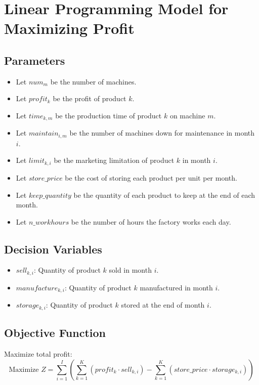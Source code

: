 \documentclass{article}
\begin{document}
\section*{Linear Programming Model for Maximizing Profit}

\subsection*{Parameters}
\begin{itemize}
    \item Let \( num_m \) be the number of machines.
    \item Let \( profit_k \) be the profit of product \( k \).
    \item Let \( time_{k,m} \) be the production time of product \( k \) on machine \( m \).
    \item Let \( maintain_{i,m} \) be the number of machines down for maintenance in month \( i \).
    \item Let \( limit_{k,i} \) be the marketing limitation of product \( k \) in month \( i \).
    \item Let \( store\_price \) be the cost of storing each product per unit per month.
    \item Let \( keep\_quantity \) be the quantity of each product to keep at the end of each month.
    \item Let \( n\_workhours \) be the number of hours the factory works each day.
\end{itemize}

\subsection*{Decision Variables}
\begin{itemize}
    \item \( sell_{k,i} \): Quantity of product \( k \) sold in month \( i \).
    \item \( manufacture_{k,i} \): Quantity of product \( k \) manufactured in month \( i \).
    \item \( storage_{k,i} \): Quantity of product \( k \) stored at the end of month \( i \).
\end{itemize}

\subsection*{Objective Function}
Maximize total profit:
\[
\text{Maximize } Z = \sum_{i=1}^{I} \left( \sum_{k=1}^{K} (profit_k \cdot sell_{k,i}) - \sum_{k=1}^{K} (store\_price \cdot storage_{k,i}) \right)
\]
\end{document}
